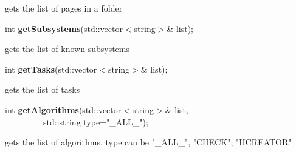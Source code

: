  gets the list of pages in a folder


\item    int {\bf getSubsystems}(std::vector$<$string$>$\& list);


 gets the list of known subsystems


\item    int {\bf getTasks}(std::vector$<$string$>$\& list);


 gets the list of tasks


\item    int {\bf getAlgorithms}(std::vector$<$string$>$\& list,\\\mbox{}~~~~~~~~~std::string type="\_ALL\_");


 gets the list of algorithms, type can be "\_ALL\_", "CHECK", "HCREATOR"


